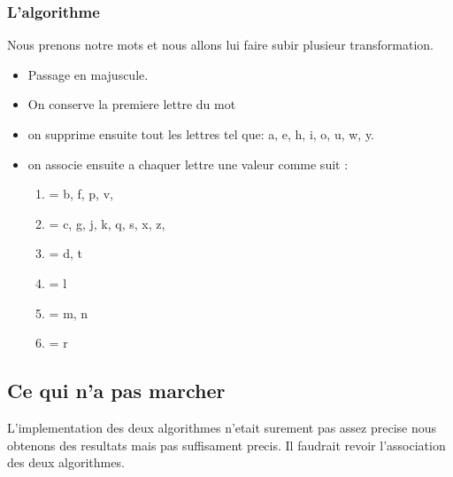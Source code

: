 \subsubsection{L'algorithme}
Nous prenons notre mots et nous allons lui faire subir plusieur transformation.
\begin{itemize}
	\item Passage en majuscule.
	\item On conserve la premiere lettre du mot 
	\item on supprime ensuite tout les lettres tel que: a, e, h, i, o, u, w, y.
	\item on associe ensuite a chaquer lettre une valeur comme suit :
		\begin{enumerate}
		\item = b, f,  p, v,
		\item = c, g, j, k, q, s, x, z,
		\item = d, t
		\item = l
		\item = m, n
		\item = r
		\end{enumerate}

\end{itemize}
\subsection{Ce qui n'a pas marcher}
L'implementation des deux algorithmes n'etait surement pas assez precise nous obtenons des resultats mais pas suffisament precis. Il faudrait revoir l'association des deux algorithmes.
